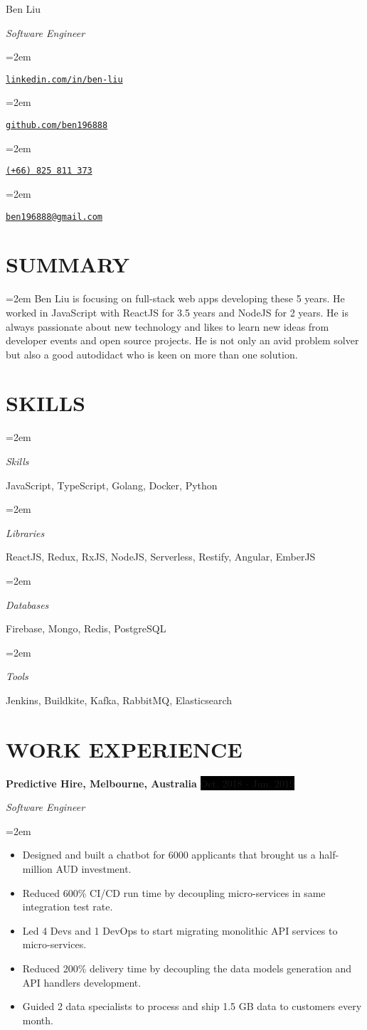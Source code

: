 \documentclass[a4paper, 11pt]{article}
\newlength{\spacebox}
\newcommand{\sepspace}{\vspace*{0.3em}}       %
\newcommand{\MyName}[1]{ %
        \noindent
		\Huge \usefont{OT1}{phv}{b}{n} #1
		\par \normalsize \normalfont}
\newcommand{\MySlogan}[1]{ %
		\noindent
		\large \usefont{OT1}{phv}{m}{n}\textit{#1}
		\par \normalsize \normalfont}
\newcommand{\NewPart}[1]{\section*{\uppercase{#1}}}
\newcommand{\PersonalEntry}[2]{
		\noindent\hangindent=2em\hangafter=0 %
		\parbox{\spacebox}{        %
		\hfill\textit{#1}}		       %
		\hfill\hspace{1.2em} #2 \par}    %
\newcommand{\SummaryEntry}[1]{
		\noindent\hangindent=2em\hangafter=0
		\noindent #1
		\normalsize \par}
\newcommand{\SkillsEntry}[2]{      %
		\noindent\hangindent=2em\hangafter=0 %
		\parbox{\spacebox}{        %
		\textit{#1}}			   %
		\hspace{1.2em} #2 \par}    %
\newcommand{\EducationEntry}[4]{
		\noindent \textbf{#1} \hfill      %
		\colorbox{White}{%
			\parbox{5cm}{%
			\hfill\color{Black}#2}} \par  %
		\noindent \textit{#3} \par        %
		\noindent\hangindent=2em\hangafter=0 \small #4 %
		\normalsize \par}
\newcommand{\WorkEntry}[4]{				  %
		\noindent \textbf{#1} \hfill      %
		\noindent\colorbox{Black}{\color{White}#2} \par  %
		\noindent \textit{#3} \par              %
		\noindent\hangindent=2em\hangafter=0 \small #4 %
		\normalsize \par}
\begin{document}
\parbox{0.35\textwidth}{
	\MyName{Ben Liu}
	\MySlogan{Software Engineer}
}
\parbox{0.6\textwidth}{

\PersonalEntry{}{\href{https://www.linkedin.com/in/ben-liu}{\texttt{linkedin.com/in/ben-liu}}}
\PersonalEntry{}{\href{https://github.com/ben196888}{\texttt{github.com/ben196888}}}
\PersonalEntry{}{\href{tel:+66-825-811-373}{\texttt{(+66) 825 811 373}}}
\PersonalEntry{}{\href{mailto:ben196888@gmail.com}{\texttt{ben196888@gmail.com}}}
}
\sepspace

\NewPart{Summary}{}

\SummaryEntry{%
Ben Liu is focusing on full-stack web apps developing these 5 years.
He worked in JavaScript with ReactJS for 3.5 years and NodeJS for 2 years.
He is always passionate about new technology and likes to learn new ideas from developer events and open source projects.
He is not only an avid problem solver but also a good autodidact who is keen on more than one solution.
}

\NewPart{Skills}{}

\SkillsEntry{Skills}    {JavaScript, TypeScript, Golang, Docker, Python}
\SkillsEntry{Libraries} {ReactJS, Redux, RxJS, NodeJS, Serverless, Restify, Angular, EmberJS}
\SkillsEntry{Databases} {Firebase, Mongo, Redis, PostgreSQL}
\SkillsEntry{Tools}     {Jenkins, Buildkite, Kafka, RabbitMQ, Elasticsearch}

\NewPart{Work Experience}{}

\WorkEntry{Predictive Hire, Melbourne, Australia}{Oct. 2018 - Jun. 2019}{Software Engineer}{
\begin{itemize}
	\item {Designed and built a chatbot for 6000 applicants that brought us a half-million AUD investment.}
	\item {Reduced 600\% CI/CD run time by decoupling micro-services in same integration test rate.}
	\item {Led 4 Devs and 1 DevOps to start migrating monolithic API services to micro-services.}
	\item {Reduced 200\% delivery time by decoupling the data models generation and API handlers development.}
	\item {Guided 2 data specialists to process and ship 1.5 GB data to customers every month.}
\end{itemize}
}
\end{document}
